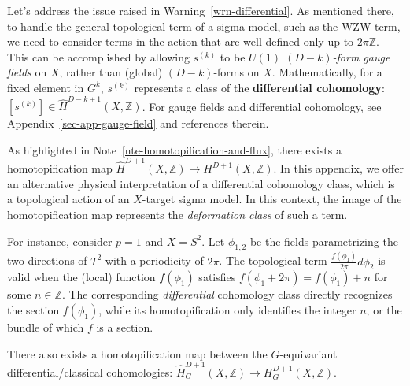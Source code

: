 \documentclass[11pt,toc=bibliography]{scrbook}
\numberwithin{equation}{section}
\begin{document}
Let's address the issue raised in Warning~\ref{wrn-differential}. As
mentioned there, to handle the general topological term of a sigma
model, such as the WZW term, we need to consider terms in the action
that are well-defined only up to \(2\pi \mathbb{Z}\). This can be
accomplished by allowing \(s^{(k)}\) to be \emph{\(U(1)\) \((D-k)\)-form
gauge fields} on \(X\), rather than (global) \((D-k)\)-forms on \(X\).
Mathematically, for a fixed element in \(G^k\), \(s^{(k)}\) represents a
class of the \textbf{differential cohomology}:
\([s^{(k)}]\in\hat{H}^{D-k+1}(X,\mathbb{Z})\). For gauge fields and
differential cohomology, see Appendix~\ref{sec-app-gauge-field} and
references therein.

\begin{tcolorbox}[enhanced jigsaw, opacityback=0, opacitybacktitle=0.6, leftrule=.75mm, arc=.35mm, coltitle=black, breakable, colframe=quarto-callout-note-color-frame, titlerule=0mm, colback=white, bottomrule=.15mm, left=2mm, colbacktitle=quarto-callout-note-color!10!white, toptitle=1mm, bottomtitle=1mm, title=\textcolor{quarto-callout-note-color}{\faInfo}\hspace{0.5em}{Homotopification and deformation classes}, rightrule=.15mm, toprule=.15mm]

As highlighted in Note~\ref{nte-homotopification-and-flux}, there exists
a homotopification map
\(\hat{H}^{D+1}(X,\mathbb{Z}) \to H^{D+1}(X,\mathbb{Z})\). In this
appendix, we offer an alternative physical interpretation of a
differential cohomology class, which is a topological action of an
\(X\)-target sigma model. In this context, the image of the
homotopification map represents the \emph{deformation class} of such a
term.

For instance, consider \(p=1\) and \(X=S^2\). Let \(\phi_{1,2}\) be the
fields parametrizing the two directions of \(T^2\) with a periodicity of
\(2\pi\). The topological term \(\frac{f(\phi_1)}{2\pi}d\phi_2\) is
valid when the (local) function \(f(\phi_1)\) satisfies
\(f(\phi_1+2\pi) = f(\phi_1) + n\) for some \(n \in \mathbb{Z}\). The
corresponding \emph{differential} cohomology class directly recognizes
the section \(f(\phi_1)\), while its homotopification only identifies
the integer \(n\), or the bundle of which \(f\) is a section.

There also exists a homotopification map between the \(G\)-equivariant
differential/classical cohomologies:
\(\hat{H}^{D+1}_G(X,\mathbb{Z}) \to H^{D+1}_G(X,\mathbb{Z})\).

\end{tcolorbox}
\end{document}
